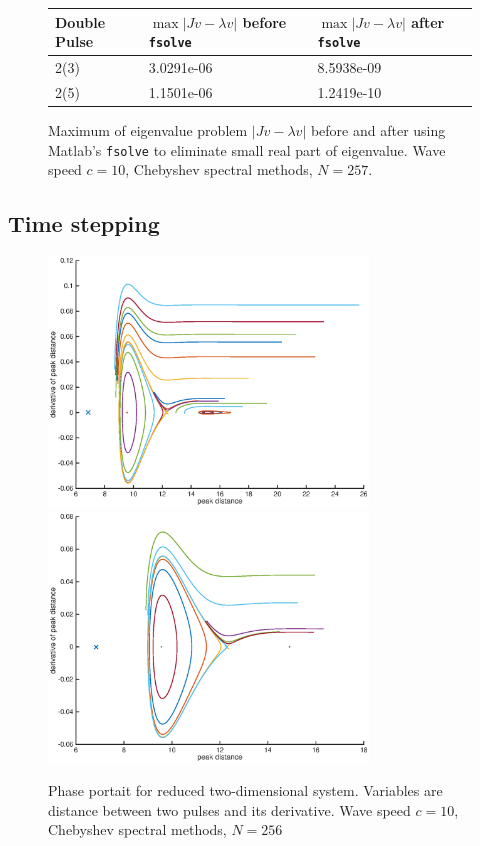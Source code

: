 \documentclass[12pt]{article}
\begin{document}
\begin{figure}[H]
\begin{tabular}{l|ll}
 Double Pulse   & $\max{|Jv - \lambda v|}$ before \texttt{fsolve} & $\max{|Jv - \lambda v|}$ after \texttt{fsolve}\\ \hline
  2(3) & 3.0291e-06 & 8.5938e-09 \\
  2(5) & 1.1501e-06 & 1.2419e-10 \\
\end{tabular}
\caption{Maximum of eigenvalue problem $|Jv - \lambda v|$ before and after using Matlab's \texttt{fsolve} to eliminate small real part of eigenvalue. Wave speed $c = 10$, Chebyshev spectral methods, $N = 257$.}
\end{figure}

\subsection{Time stepping}

\begin{figure}[H]
	\includegraphics[width=8.5cm]{phaseportrait1}
	\includegraphics[width=8.5cm]{phaseportrait2}
	\caption{Phase portait for reduced two-dimensional system. Variables are distance between two pulses and its derivative. Wave speed $c = 10$, Chebyshev spectral methods, $N = 256$}
\end{figure}
\end{document}
